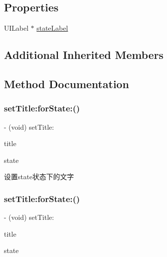 \subsection*{Properties}
\begin{DoxyCompactItemize}
\item 
U\+I\+Label $\ast$ \mbox{\hyperlink{interface_m_j_refresh_back_state_footer_a1e2117848e4440866614f42fc2950239}{state\+Label}}
\end{DoxyCompactItemize}
\subsection*{Additional Inherited Members}


\subsection{Method Documentation}
\mbox{\label{interface_m_j_refresh_back_state_footer_ad98ad72f87b75b7738c7512c6e6bb7b7}} 
\subsubsection{\texorpdfstring{set\+Title\+:for\+State\+:()}{setTitle:forState:()}\hspace{0.1cm}{\footnotesize\ttfamily [1/3]}}
{\footnotesize\ttfamily -\/ (void) set\+Title\+: \begin{DoxyParamCaption}\item[{(N\+S\+String $\ast$)}]{title }\item[{forState:(M\+J\+Refresh\+State)}]{state }\end{DoxyParamCaption}}

设置state状态下的文字 \mbox{\label{interface_m_j_refresh_back_state_footer_ad98ad72f87b75b7738c7512c6e6bb7b7}} 
\subsubsection{\texorpdfstring{set\+Title\+:for\+State\+:()}{setTitle:forState:()}\hspace{0.1cm}{\footnotesize\ttfamily [2/3]}}
{\footnotesize\ttfamily -\/ (void) set\+Title\+: \begin{DoxyParamCaption}\item[{(N\+S\+String $\ast$)}]{title }\item[{forState:(M\+J\+Refresh\+State)}]{state }\end{DoxyParamCaption}}

